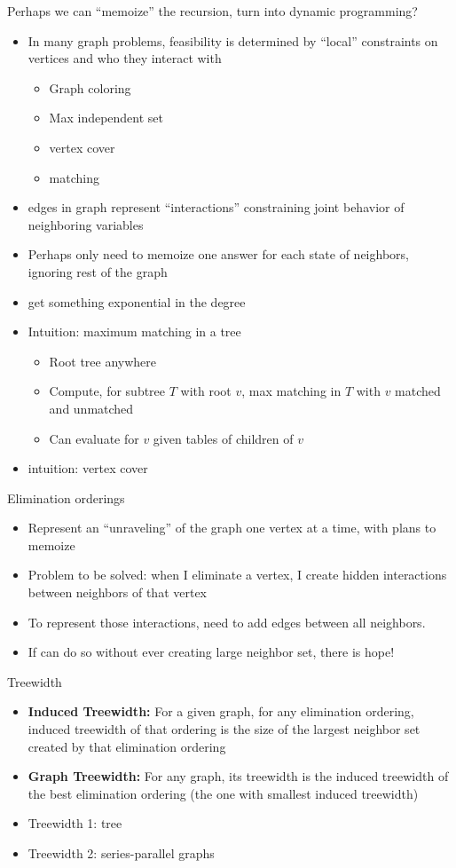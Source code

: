 \documentclass{article}
\begin{document}
Perhaps we can ``memoize'' the recursion, turn into dynamic
  programming?
\begin{itemize}
\item In many graph problems, feasibility is determined by ``local''
   constraints on vertices and who they interact with
\begin{itemize}
\item Graph coloring
\item Max independent set
\item vertex cover
\item matching
\end{itemize}
\item edges in graph represent ``interactions'' constraining joint
   behavior of neighboring variables
\item Perhaps only need to memoize one answer for each state of
neighbors, ignoring rest of the graph
\item get something exponential in the degree
\item Intuition: maximum matching in a tree
\begin{itemize}
\item Root tree anywhere
\item Compute, for subtree $T$ with root $v$, max matching in $T$ with $v$
  matched and unmatched
\item Can evaluate for $v$ given tables of children of $v$
\end{itemize}
\item intuition: vertex cover
\end{itemize}

Elimination orderings
\begin{itemize}
\item Represent an ``unraveling'' of the graph one vertex at a time,
  with plans to memoize
\item Problem to be solved: when I eliminate a vertex, I create hidden
  interactions between neighbors of that vertex
\item To represent those interactions, need to add edges between all
  neighbors.
\item If can do so without ever creating large neighbor set, there is
  hope!
\end{itemize}

Treewidth
\begin{itemize}
\item \textbf{ Induced Treewidth:} For a given graph, for any elimination ordering, induced treewidth of that ordering is the size of the largest neighbor set created by
  that elimination ordering
\item \textbf{ Graph Treewidth:} For any graph, its treewidth is the induced treewidth of the best elimination ordering (the one with smallest induced treewidth)
\item Treewidth 1: tree
\item Treewidth 2: series-parallel graphs
\end{itemize}
\end{document}
